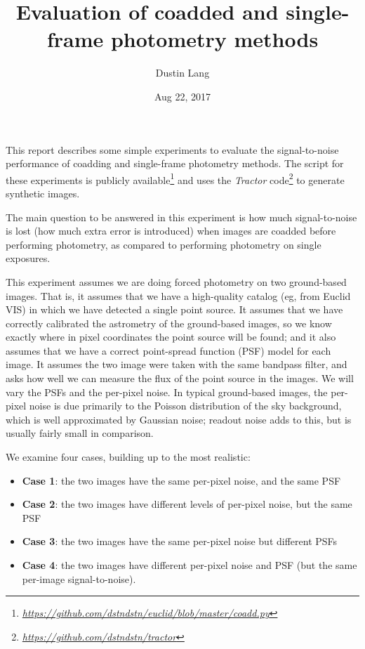 \documentclass[letter,11pt]{article}
\author{Dustin Lang}
\date{Aug 22, 2017}
\title{Evaluation of coadded and single-frame photometry methods}
\newcommand{\niceurl}[1]{\href{#1}{\textsl{#1}}}
\newcommand{\code}[1]{\textsl{#1}}
\begin{document}
\maketitle

This report describes some simple experiments to evaluate the
signal-to-noise performance of coadding and single-frame photometry
methods.  The script for these experiments is publicly
available\footnote{%
  \niceurl{https://github.com/dstndstn/euclid/blob/master/coadd.py}}
and uses the \code{Tractor} code\footnote{%
  \niceurl{https://github.com/dstndstn/tractor}} to generate synthetic images.

The main question to be answered in this experiment is how much
signal-to-noise is lost (how much extra error is introduced) when
images are coadded before performing photometry, as compared to
performing photometry on single exposures.

This experiment assumes we are doing forced photometry on two
ground-based images.  That is, it assumes that we have a high-quality
catalog (eg, from Euclid VIS) in which we have detected a single point
source.  It assumes that we have correctly calibrated the astrometry
of the ground-based images, so we know exactly where in pixel
coordinates the point source will be found; and it also assumes that
we have a correct point-spread function (PSF) model for each image.
It assumes the two image were taken with the same bandpass filter, and
asks how well we can measure the flux of the point source in the
images.  We will vary the PSFs and the per-pixel noise.  In typical
ground-based images, the per-pixel noise is due primarily to the
Poisson distribution of the sky background, which is well approximated
by Gaussian noise; readout noise adds to this, but is usually fairly
small in comparison.

We examine four cases, building up to the most realistic:
\begin{itemize}
\item \textbf{Case 1}: the two images have the same per-pixel noise,
  and the same PSF
\item \textbf{Case 2}: the two images have different levels of
  per-pixel noise, but the same PSF
\item \textbf{Case 3}: the two images have the same per-pixel noise
  but different PSFs
\item \textbf{Case 4}: the two images have different per-pixel noise
  and PSF (but the same per-image signal-to-noise).
\end{itemize}
\end{document}
